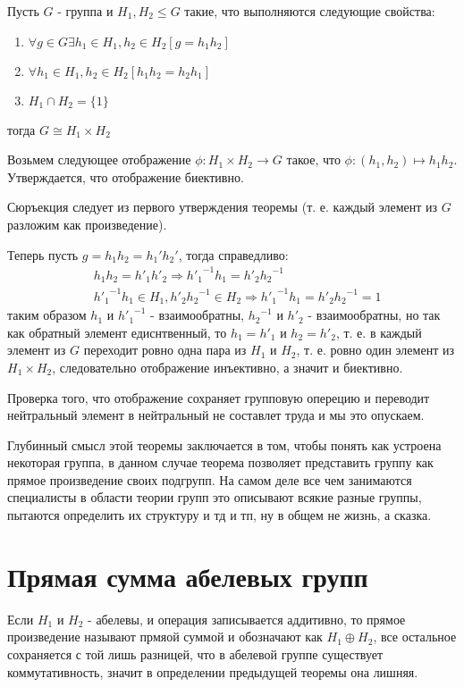 \begin{Th}
Пусть $G$ - группа и $H_1, H_2 \le G$ такие, что выполняются следующие свойства:
\begin{enumerate}
\item $\forall g \in G \exists h_1 \in H_1, h_2 \in H_2 \left[g = h_1h_2\right]$

\item $\forall h_1 \in H_1, h_2 \in H_2 \left[h_1h_2 = h_2h_1\right]$

\item $H_1 \cap H_2 = \{1\}$
\end{enumerate}
тогда $G \cong H_1 \times H_2$
\end{Th}

\begin{Proof}
Возьмем следующее отображение $\phi : H_1 \times H_2 \rightarrow G$ такое, что $\phi : \left(h_1, h_2\right) \mapsto h_1h_2$. Утверждается, что отображение биективно.

Сюръекция следует из первого утверждения теоремы (т. е. каждый элемент из $G$ разложим как произведение).

Теперь пусть $g = h_1h_2 = h_1'h_2'$, тогда справедливо:
\[
	\begin{split}
		& h_1h_2 = h'_1h'_2 \Rightarrow {h'_1}^{-1}h_1 = h'_2{h_2}^{-1} \\
		& {h'_1}^{-1}h_1 \in H_1, h'_2{h_2}^{-1} \in H_2 \Rightarrow {h'_1}^{-1}h_1 = h'_2{h_2}^{-1} = 1
	\end{split}
\]
таким образом $h_1$ и ${h'_1}^{-1}$ - взаимообратны, ${h_2}^{-1}$ и $h'_2$ - взаимообратны, но так как обратный элемент едиснтвенный, то $h_1 = h'_1$ и $h_2 = h'_2$, т. е. в каждый элемент из $G$ переходит ровно одна пара из $H_1$ и $H_2$, т. е. ровно один элемент из $H_1 \times H_2$, следовательно отображение инъективно, а значит и биективно.

Проверка того, что отображение сохраняет групповую оперецию и переводит нейтральный элемент в нейтральный не составлет труда и мы это опускаем.
\end{Proof}

Глубинный смысл этой теоремы заключается в том, чтобы понять как устроена некоторая группа, в данном случае теорема позволяет представить группу как прямое произведение своих подгрупп. На самом деле все чем занимаются специалисты в области теории групп это описывают всякие разные группы, пытаются определить их структуру и тд и тп, ну в общем не жизнь, а сказка.

\section{Прямая сумма абелевых групп}
Если $H_1$ и $H_2$ - абелевы, и операция записывается аддитивно, то прямое произведение называют прмяой суммой и обозначают как $H_1 \oplus H_2$, все остальное сохраняется с той лишь разницей, что в абелевой группе существует коммутативность, значит в определении предыдущей теоремы она лишняя.

